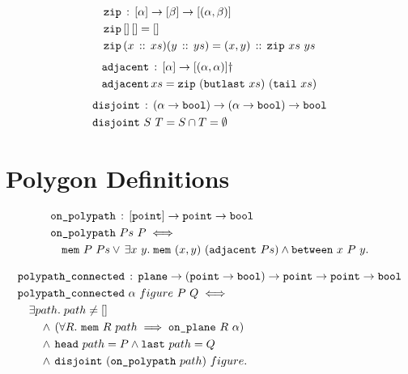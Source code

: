 \begin{align*}
  & \texttt{zip}\,:\,[\alpha]\rightarrow[\beta]\rightarrow[(\alpha,\beta)]\\
  & \texttt{zip}\,[]\,[] = []\\
  & \texttt{zip}\,(x\,::\,xs)(y\,::\,ys) = (x,y)\,::\,\texttt{zip}\ xs\ ys
\end{align*}
\begin{align*}
  & \code{adjacent}\,:\,[\alpha]\rightarrow[(\alpha,\alpha)]\dag\\
  & \code{adjacent}\,xs = \code{zip}\ (\code{butlast}\ xs)\ (\code{tail}\ xs)
\end{align*}
\begin{align*}
  & \texttt{disjoint}\,:\,(\alpha\rightarrow\texttt{bool})\rightarrow(\alpha\rightarrow\texttt{bool})\rightarrow\texttt{bool}\\
  & \texttt{disjoint}\ S\ T = S \cap T = \emptyset
\end{align*}

\section{Polygon Definitions}
\begin{align*}
  &\code{on\_polypath}\,:\,[\code{point}] \rightarrow \code{point} \rightarrow \code{bool}\\
  &\code{on\_polypath}\ Ps\ P \iff\\
  &\quad\code{mem}\ P\ Ps\vee\,\exists x\ y.\; \code{mem}\ (x,y)\ (\code{adjacent}\ Ps) \wedge \between{x}{P}{y}.
\end{align*}

\begin{align*}
  &\code{polypath\_connected}\,:\,\code{plane}\rightarrow(\code{point} \rightarrow \code{bool}) \rightarrow \code{point} \rightarrow \code{point} \rightarrow \code{bool}\\
  &\code{polypath\_connected}\ \alpha\ figure\ P\ Q \iff\\
  &\quad\exists path.\; path \neq []\\
  &\qquad\wedge\,(\forall R.\ \code{mem}\ R\ path \implies \onplane{R}{\alpha})\\
  &\qquad\wedge\,\code{head}\ path = P \wedge \code{last}\ path = Q\\
  &\qquad\wedge\,\code{disjoint}\ (\code{on\_polypath}\ path)\ figure.
\end{align*}

